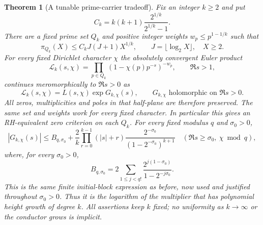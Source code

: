 \documentclass[11pt]{article}
\newtheorem{theorem}{Theorem}[section]
\theoremstyle{definition}
\begin{document}
\begin{theorem}[A tunable prime-carrier tradeoff]
\label{thm:prime-carrier-power-tradeoff}
Fix an integer $k\ge2$ and put
\[
 C_k=k(k+1)\frac{2^{1/k}}{2^{1/k}-1}.
\]
There are a fixed prime set $Q_k$ and positive integer
weights $w_p\le p^{1-1/k}$ such that
\[
 \pi_{Q_k}(X)\le C_k J(J+1)X^{1/k},
 \qquad J=\lfloor\log_2X\rfloor,\quad X\ge2.
\]
For every fixed Dirichlet character $\chi$ the absolutely
convergent Euler product
\[
 \mathcal L_k(s,\chi)
 =\prod_{p\in Q_k}(1-\chi(p)p^{-s})^{-w_p},
 \qquad \Re s>1,
\]
continues meromorphically to $\Re s>0$ as
\[
 \mathcal L_k(s,\chi)=L(s,\chi)\exp G_{k,\chi}(s),
 \qquad G_{k,\chi}\text{ holomorphic on }\Re s>0.
\]
All zeros, multiplicities and poles in that half-plane are
therefore preserved. The same set and weights work for every
fixed character. In particular this gives an RH-equivalent
zero criterion on each $Q_k$.
For every fixed modulus $q$ and $\sigma_0>0$,
\[
 |G_{k,\chi}(s)|\le B_{q,\sigma_0}
       +\frac{2}{k}\prod_{r=0}^{k-1}(|s|+r)
                  \frac{2^{-\sigma_0}}{(1-2^{-\sigma_0})^{k+1}}
 \quad(\Re s\ge\sigma_0,\ \chi\bmod q),
\]
where, for every $\sigma_0>0$,
\[
 B_{q,\sigma_0}
   =2\sum_{1\le j<q!}\frac{2^{j(1-\sigma_0)}}{1-2^{-j\sigma_0}}.
\]
This is the same finite initial-block expression as before,
now used and justified throughout $\sigma_0>0$.
Thus it is the \emph{logarithm of the multiplier} that has
polynomial height growth of degree $k$.
All assertions keep $k$ fixed; no uniformity as $k\to\infty$
or the conductor grows is implicit.
\end{theorem}
\end{document}
